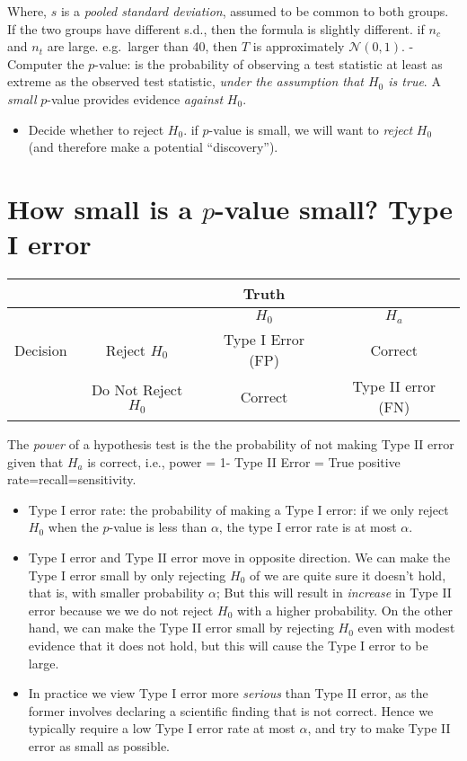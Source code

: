 \documentclass[
  letterpaper,
  DIV=11,
  numbers=noendperiod]{scrreprt}
\providecommand{\tightlist}{%
  \setlength{\itemsep}{0pt}\setlength{\parskip}{0pt}}\usepackage{longtable,booktabs,array}
\begin{document}
Where, \(s\) is a \emph{pooled standard deviation}, assumed to be common
to both groups. If the two groups have different s.d., then the formula
is slightly different. if \(n_c\) and \(n_t\) are large. e.g.~larger
than 40, then \(T\) is approximately \(\mathcal{N}(0,1)\). - Computer
the \(p\)-value: is the probability of observing a test statistic at
least as extreme as the observed test statistic, \emph{under the
assumption that \(H_0\) is true}. A \emph{small} \(p\)-value provides
evidence \emph{against} \(H_0\).

\begin{itemize}
\tightlist
\item
  Decide whether to reject \(H_0\). if \(p\)-value is small, we will
  want to \emph{reject} \(H_0\) (and therefore make a potential
  ``discovery'').
\end{itemize}

\section{\texorpdfstring{How small is a \(p\)-value small? Type I
error}{How small is a p-value small? Type I error}}\label{how-small-is-a-p-value-small-type-i-error}

\begin{longtable}[]{@{}lccc@{}}
\toprule\noalign{}
& & Truth & \\
\midrule\noalign{}
\endhead
\bottomrule\noalign{}
\endlastfoot
& & \(H_0\) & \(H_a\) \\
Decision & Reject \(H_0\) & Type I Error (FP) & Correct \\
& Do Not Reject \(H_0\) & Correct & Type II error (FN) \\
\end{longtable}

The \emph{power} of a hypothesis test is the the probability of not
making Type II error given that \(H_a\) is correct, i.e., power = 1-
Type II Error = True positive rate=recall=sensitivity.

\begin{itemize}
\item
  Type I error rate: the probability of making a Type I error: if we
  only reject \(H_0\) when the \(p\)-value is less than \(\alpha\), the
  type I error rate is at most \(\alpha\).
\item
  Type I error and Type II error move in opposite direction. We can make
  the Type I error small by only rejecting \(H_0\) of we are quite sure
  it doesn't hold, that is, with smaller probability \(\alpha\); But
  this will result in \emph{increase} in Type II error because we we do
  not reject \(H_0\) with a higher probability. On the other hand, we
  can make the Type II error small by rejecting \(H_0\) even with modest
  evidence that it does not hold, but this will cause the Type I error
  to be large.
\item
  In practice we view Type I error more \emph{serious} than Type II
  error, as the former involves declaring a scientific finding that is
  not correct. Hence we typically require a low Type I error rate at
  most \(\alpha\), and try to make Type II error as small as possible.
\end{itemize}
\end{document}

